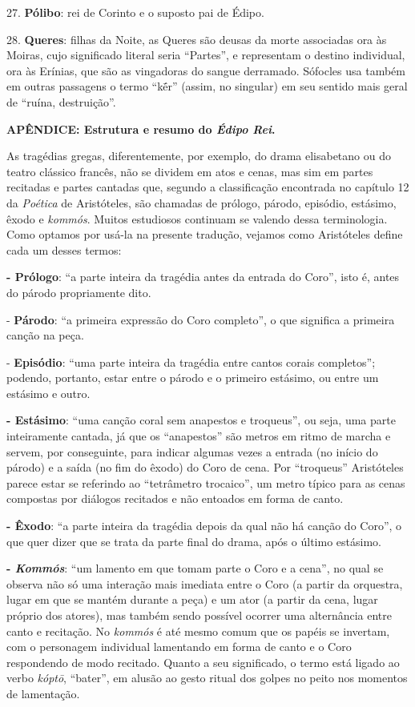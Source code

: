 27. \textbf{Pólibo}: rei de Corinto e o suposto pai de Édipo.

28. \textbf{Queres}: filhas da Noite, as Queres são deusas da morte
associadas ora às Moiras, cujo significado literal seria ``Partes'', e
representam o destino individual, ora às Erínias, que são as vingadoras
do sangue derramado. Sófocles usa também em outras passagens o termo
``kḗr'' (assim, no singular) em seu sentido mais geral de ``ruína,
destruição''.

\textbf{APÊNDICE: Estrutura e resumo do \emph{Édipo Rei}. }

As tragédias gregas, diferentemente, por exemplo, do drama elisabetano
ou do teatro clássico francês, não se dividem em atos e cenas, mas sim
em partes recitadas e partes cantadas que, segundo a classificação
encontrada no capítulo 12 da \emph{Poética} de Aristóteles, são chamadas
de prólogo, párodo, episódio, estásimo, êxodo e \emph{kommós}. Muitos
estudiosos continuam se valendo dessa terminologia. Como optamos por
usá-la na presente tradução, vejamos como Aristóteles define cada um
desses termos:

\textbf{- Prólogo}: ``a parte inteira da tragédia antes da entrada do
Coro'', isto é, antes do párodo propriamente dito.

- \textbf{Párodo}: ``a primeira expressão do Coro completo'', o que
significa a primeira canção na peça.

- \textbf{Episódio}: ``uma parte inteira da tragédia entre cantos corais
completos''; podendo, portanto, estar entre o párodo e o primeiro
estásimo, ou entre um estásimo e outro.

\textbf{- Estásimo}: ``uma canção coral sem anapestos e troqueus'', ou
seja, uma parte inteiramente cantada, já que os ``anapestos'' são metros
em ritmo de marcha e servem, por conseguinte, para indicar algumas vezes
a entrada (no início do párodo) e a saída (no fim do êxodo) do Coro de
cena. Por ``troqueus'' Aristóteles parece estar se referindo ao
``tetrâmetro trocaico'', um metro típico para as cenas compostas por
diálogos recitados e não entoados em forma de canto.

\textbf{- Êxodo}: ``a parte inteira da tragédia depois da qual não há
canção do Coro'', o que quer dizer que se trata da parte final do drama,
após o último estásimo.

\textbf{- \emph{Kommós}}: ``um lamento em que tomam parte o Coro e a
cena'', no qual se observa não só uma interação mais imediata entre o
Coro (a partir da orquestra, lugar em que se mantém durante a peça) e um
ator (a partir da cena, lugar próprio dos atores), mas também sendo
possível ocorrer uma alternância entre canto e recitação. No
\emph{kommós} é até mesmo comum que os papéis se invertam, com o
personagem individual lamentando em forma de canto e o Coro respondendo
de modo recitado. Quanto a seu significado, o termo está ligado ao verbo
\emph{kóptō}, ``bater'', em alusão ao gesto ritual dos golpes no peito
nos momentos de lamentação.

